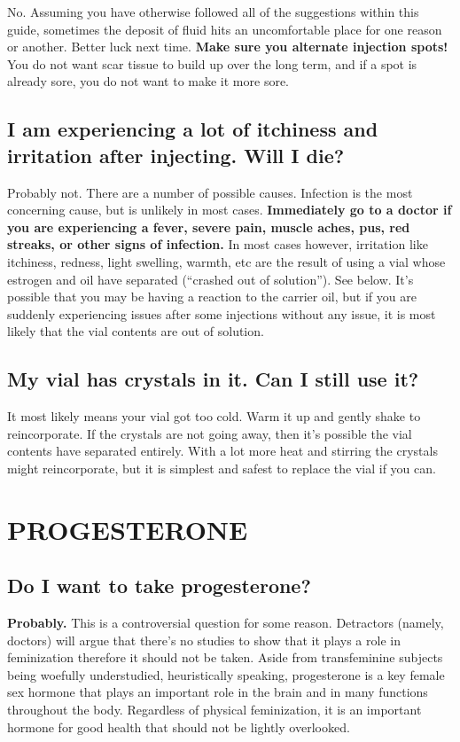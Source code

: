 \documentclass{article}
\begin{document}
No. Assuming you have otherwise followed all of the suggestions within this guide, sometimes the deposit of fluid hits an uncomfortable place for one reason or another. Better luck next time. \textbf{Make sure you alternate injection spots!} You do not want scar tissue to build up over the long term, and if a spot is already sore, you do not want to make it more sore.

\subsection{I am experiencing a lot of itchiness and irritation after injecting. Will I die?}

Probably not. There are a number of possible causes. Infection is the most concerning cause, but is unlikely in most cases. \textbf{Immediately go to a doctor if you are experiencing a fever, severe pain, muscle aches, pus, red streaks, or other signs of infection.} In most cases however, irritation like itchiness, redness, light swelling, warmth, etc are the result of using a vial whose estrogen and oil have separated (“crashed out of solution”). See below. It’s possible that you may be having a reaction to the carrier oil, but if you are suddenly experiencing issues after some injections without any issue, it is most likely that the vial contents are out of solution.

\subsection{My vial has crystals in it. Can I still use it?}

It most likely means your vial got too cold. Warm it up and gently shake to reincorporate. If the crystals are not going away, then it’s possible the vial contents have separated entirely. With a lot more heat and stirring the crystals might reincorporate, but it is simplest and safest to replace the vial if you can.



\section{PROGESTERONE}

\subsection{Do I want to take progesterone?}

\textbf{Probably.} This is a controversial question for some reason. Detractors (namely, doctors) will argue that there’s no studies to show that it plays a role in feminization therefore it should not be taken. Aside from transfeminine subjects being woefully understudied, heuristically speaking, progesterone is a key female sex hormone that plays an important role in the brain and in many functions throughout the body. Regardless of physical feminization, it is an important hormone for good health that should not be lightly overlooked.
\end{document}
